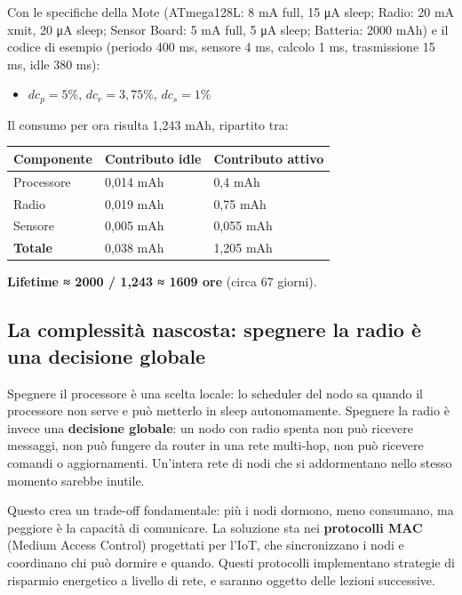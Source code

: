 \documentclass[
  italian,
  openany]{book}
\newcounter{none} %
\providecommand{\tightlist}{%
  \setlength{\itemsep}{0pt}\setlength{\parskip}{0pt}}
\begin{document}
Con le specifiche della Mote (ATmega128L: 8 mA full, 15 μA sleep; Radio:
20 mA xmit, 20 μA sleep; Sensor Board: 5 mA full, 5 μA sleep; Batteria:
2000 mAh) e il codice di esempio (periodo 400 ms, sensore 4 ms, calcolo
1 ms, trasmissione 15 ms, idle 380 ms):

\begin{itemize}
\tightlist
\item
  \(dc_p = 5\%\), \(dc_r = 3,75\%\), \(dc_s = 1\%\)
\end{itemize}

Il consumo per ora risulta 1,243 mAh, ripartito tra:

{\def\LTcaptype{none} %
\begin{longtable}[]{@{}lll@{}}
\toprule\noalign{}
Componente & Contributo idle & Contributo attivo \\
\midrule\noalign{}
\endhead
\bottomrule\noalign{}
\endlastfoot
Processore & 0,014 mAh & 0,4 mAh \\
Radio & 0,019 mAh & 0,75 mAh \\
Sensore & 0,005 mAh & 0,055 mAh \\
\textbf{Totale} & 0,038 mAh & 1,205 mAh \\
\end{longtable}
}

\textbf{Lifetime ≈ 2000 / 1,243 ≈ 1609 ore} (circa 67 giorni).

\subsection{La complessità nascosta: spegnere la radio è una decisione
globale}\label{la-complessituxe0-nascosta-spegnere-la-radio-uxe8-una-decisione-globale}

Spegnere il processore è una scelta locale: lo scheduler del nodo sa
quando il processore non serve e può metterlo in sleep autonomamente.
Spegnere la radio è invece una \textbf{decisione globale}: un nodo con
radio spenta non può ricevere messaggi, non può fungere da router in una
rete multi-hop, non può ricevere comandi o aggiornamenti. Un'intera rete
di nodi che si addormentano nello stesso momento sarebbe inutile.

Questo crea un trade-off fondamentale: più i nodi dormono, meno
consumano, ma peggiore è la capacità di comunicare. La soluzione sta nei
\textbf{protocolli MAC} (Medium Access Control) progettati per l'IoT,
che sincronizzano i nodi e coordinano chi può dormire e quando. Questi
protocolli implementano strategie di risparmio energetico a livello di
rete, e saranno oggetto delle lezioni successive.
\end{document}
